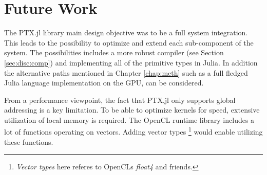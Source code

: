 \chapter{Future Work}

The PTX.jl library main design objective was to be a full system
integration. This leads to the possibility to optimize and extend each
sub-component of the system. The possibilities includes a more robust
compiler (see Section \ref{sec:disc:comp}) and implementing all of the
primitive types in Julia. In addition the alternative paths mentioned
in Chapter \ref{chap:meth} such as a full fledged Julia language
implementation on the GPU, can be considered.

From a performance viewpoint, the fact that PTX.jl only supports
global addressing is a key limitation. To be able to optimize kernels
for speed, extensive utilization of local memory is required. The
OpenCL runtime library includes a lot of functions operating on
vectors. Adding vector types \footnote{\textit{Vector types} here
  referes to OpenCLs \textit{float4} and friends.} would enable
utilizing these functions.
